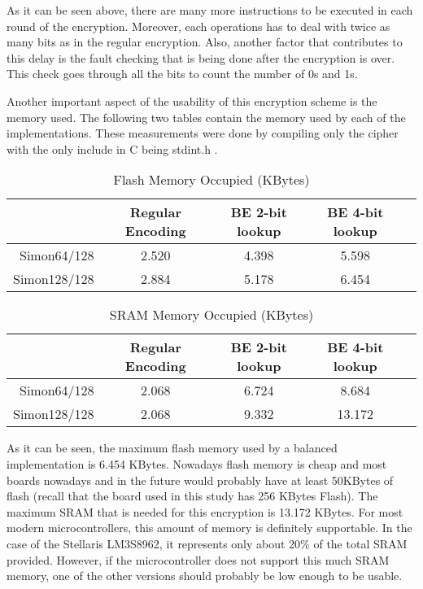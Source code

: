 \documentclass[conference]{IEEEtran}
\begin{document}
As it can be seen above, there are many more instructions to be executed in each round of the encryption. Moreover, each operations has to deal with twice as many bits as in the regular encryption. Also, another factor that contributes to this delay is the fault checking that is being done after the encryption is over. This check goes through all the bits to count the number of 0s and 1s.

Another important aspect of the usability of this encryption scheme is the memory used. The following two tables contain the memory used by each of the implementations. These measurements were done by compiling only the cipher with the only include in C being stdint.h .

\begin{table}[htbp]
  \renewcommand{\arraystretch}{1.3}
  \caption{Flash Memory Occupied (KBytes)}
  \vspace{0.05 in}
  \label{tab:space4}
  \centering
  \begin{tabular}{r|cccp{0.5in}}
    ~ & Regular Encoding  & BE 2-bit lookup & BE 4-bit lookup \\ \hline
    Simon64/128  & 2.520 & 4.398 & 5.598\\
    Simon128/128 & 2.884 & 5.178 & 6.454\\
  \end{tabular}
\end{table}


\begin{table}[htbp]
  \renewcommand{\arraystretch}{1.3}
  \caption{SRAM Memory Occupied (KBytes)}
  \vspace{0.05 in}
  \label{tab:space8}
  \centering
  \begin{tabular}{r|cccp{0.5in}}
    ~ & Regular Encoding  & BE 2-bit lookup & BE 4-bit lookup \\ \hline
    Simon64/128  & 2.068 & 6.724 & 8.684\\
    Simon128/128 & 2.068 & 9.332 & 13.172\\
  \end{tabular}
\end{table}

As it can be seen, the maximum flash memory used by a balanced implementation is 6.454 KBytes. Nowadays flash memory is cheap and most boards nowadays and in the future would probably have at least 50KBytes of flash (recall that the board used in this study has 256 KBytes Flash). The maximum SRAM that is needed for this encryption is 13.172 KBytes. For most modern microcontrollers, this amount of memory is definitely supportable. In the case of the Stellaris LM3S8962, it represents only about 20\% of the total SRAM provided. However, if the microcontroller does not support this much SRAM memory, one of the other versions should probably be low enough to be usable.
\end{document}
